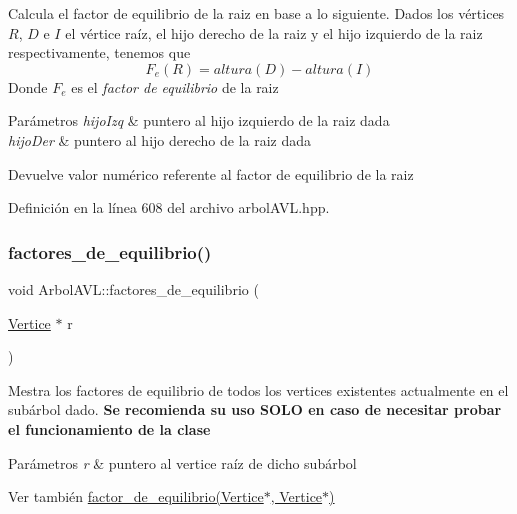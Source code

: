 Calcula el factor de equilibrio de la raiz en base a lo siguiente. Dados los vértices $R$, $D$ e $I$ el vértice raíz, el hijo derecho de la raiz y el hijo izquierdo de la raiz respectivamente, tenemos que \[ F_e(R) = altura(D) - altura(I) \] Donde $F_e$ es el {\itshape factor de equilibrio} de la raiz 
\begin{DoxyParams}{Parámetros}
{\em hijo\+Izq} & puntero al hijo izquierdo de la raiz dada \\
\hline
{\em hijo\+Der} & puntero al hijo derecho de la raiz dada \\
\hline
\end{DoxyParams}
\begin{DoxyReturn}{Devuelve}
valor numérico referente al factor de equilibrio de la raiz 
\end{DoxyReturn}


Definición en la línea 608 del archivo arbol\+A\+V\+L.\+hpp.

\mbox{\label{classArbolAVL_ae6341a610967afe9a45c6fcddb68c4c9}} 
\subsubsection{\texorpdfstring{factores\+\_\+de\+\_\+equilibrio()}{factores\_de\_equilibrio()}}
{\footnotesize\ttfamily void Arbol\+A\+V\+L\+::factores\+\_\+de\+\_\+equilibrio (\begin{DoxyParamCaption}\item[{\hyperlink{classVertice}{Vertice} $\ast$}]{r }\end{DoxyParamCaption})}



Mestra los factores de equilibrio de todos los vertices existentes actualmente en el subárbol dado. {\bfseries Se recomienda su uso S\+O\+LO en caso de necesitar probar el funcionamiento de la clase} 


\begin{DoxyParams}{Parámetros}
{\em r} & puntero al vertice raíz de dicho subárbol \\
\hline
\end{DoxyParams}
\begin{DoxySeeAlso}{Ver también}
\hyperlink{classArbolAVL_a8cf229fd1482232fbfe4803043eeec14}{factor\+\_\+de\+\_\+equilibrio(\+Vertice$\ast$, Vertice$\ast$)} 
\end{DoxySeeAlso}


